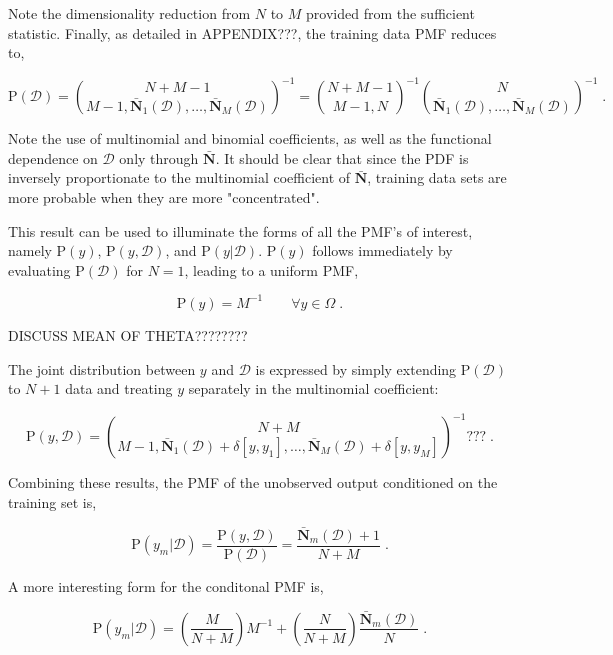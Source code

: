 \documentclass[12pt]{article}
\begin{document}
Note the dimensionality reduction from $N$ to $M$ provided from the sufficient statistic. Finally, as detailed in APPENDIX???, the training data PMF reduces to,

\begin{equation}
\text{P}(\mathcal{D}) = \binom{N+M-1}{M-1,\bar{\bm{N}}_1(\mathcal{D}),\ldots,\bar{\bm{N}}_M(\mathcal{D})}^{-1} 
= \binom{N+M-1}{M-1,N}^{-1} \binom{N}{\bar{\bm{N}}_1(\mathcal{D}),\ldots,\bar{\bm{N}}_M(\mathcal{D})}^{-1} \;.
\end{equation}

Note the use of multinomial and binomial coefficients, as well as the functional dependence on $\mathcal{D}$ only through $\bar{\bm{N}}$. It should be clear that since the PDF is inversely proportionate to the multinomial coefficient of $\bar{\bm{N}}$, training data sets are more probable when they are more "concentrated". 

This result can be used to illuminate the forms of all the PMF's of interest, namely $\text{P}(y)$, $\text{P}(y,\mathcal{D})$, and $\text{P}(y | \mathcal{D})$.  $\text{P}(y)$ follows immediately by evaluating $\text{P}(\mathcal{D})$ for $N=1$, leading to a uniform PMF,

\begin{equation}
\text{P}(y) = M^{-1} \qquad \forall y \in \Omega \;.
\end{equation}

DISCUSS MEAN OF THETA????????

The joint distribution between $y$ and $\mathcal{D}$ is expressed by simply extending $\text{P}(\mathcal{D})$ to $N+1$ data and treating $y$ separately in the multinomial coefficient:

\begin{equation}
\text{P}(y,\mathcal{D}) = \binom{N+M}{M-1,\bar{\bm{N}}_1(\mathcal{D})+\delta[y,y_1],\ldots,\bar{\bm{N}}_M(\mathcal{D})+\delta[y,y_M]}^{-1} ??? \;.
\end{equation}

Combining these results, the PMF of the unobserved output conditioned on the training set is,

\begin{equation}
\text{P}(y_m|\mathcal{D}) = \frac{\text{P}(y,\mathcal{D})}{\text{P}(\mathcal{D})} = \frac{\bar{\bm{N}}_m(\mathcal{D})+1}{N+M} \;.
\end{equation}

A more interesting form for the conditonal PMF is,

\begin{equation}
\text{P}(y_m|\mathcal{D}) = \left(\frac{M}{N+M}\right) M^{-1} + \left(\frac{N}{N+M}\right) \frac{\bar{\bm{N}}_m(\mathcal{D})}{N} \;.
\end{equation}
\end{document}
